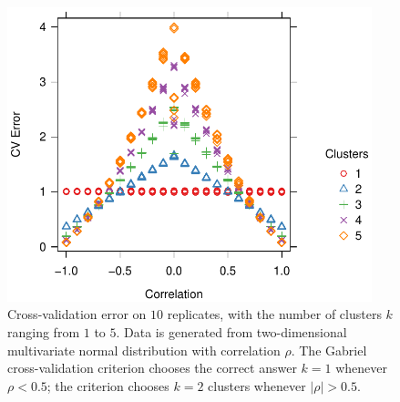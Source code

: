 \documentclass[11pt]{article}
\begin{document}
\begin{figure}
\centering
\includegraphics[width=25pc]{demo/nullcorr/equal.pdf}
\caption{Cross-validation error on $10$ replicates, with the number of
clusters $k$ ranging from $1$ to $5$.  Data is generated from two-dimensional
multivariate normal distribution with correlation $\rho$.  The Gabriel
cross-validation criterion chooses the correct answer $k = 1$ whenever
$\rho < 0.5$; the criterion chooses $k = 2$ clusters whenever $|\rho| > 0.5$.}
\label{fig:nullcorr-equal}
\end{figure}




\end{document}
